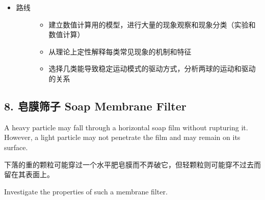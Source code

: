 \documentclass[a4paper,10pt,english]{sphinxmanual}
\begin{document}
\begin{itemize}
\item {} \begin{description}
\item[{路线}] \leavevmode\begin{itemize}
\item {} 
建立数值计算用的模型，进行大量的现象观察和现象分类（实验和数值计算）

\item {} 
从理论上定性解释每类常见现象的机制和特征

\item {} 
选择几类能导致稳定运动模式的驱动方式，分析两球的运动和驱动的关系

\end{itemize}

\end{description}

\end{itemize}


\subsection{8. 皂膜筛子 Soap Membrane Filter}
\label{\detokenize{8. Appendix:soap-membrane-filter}}
A heavy particle may fall through a horizontal soap film without rupturing it. However, a light particle may not penetrate the film and may remain on its surface.

下落的重的颗粒可能穿过一个水平肥皂膜而不弄破它，但轻颗粒则可能穿不过去而留在其表面上。

Investigate the properties of such a membrane filter.
\end{document}
